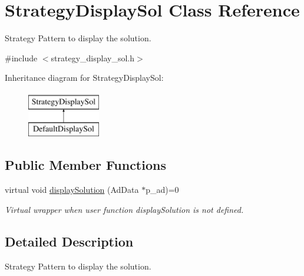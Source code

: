 \hypertarget{classStrategyDisplaySol}{\section{\-Strategy\-Display\-Sol \-Class \-Reference}
\label{classStrategyDisplaySol}
}


\-Strategy \-Pattern to display the solution.  




{\ttfamily \#include $<$strategy\-\_\-display\-\_\-sol.\-h$>$}

\-Inheritance diagram for \-Strategy\-Display\-Sol\-:\begin{figure}[H]
\begin{center}
\leavevmode
\includegraphics[height=2.000000cm]{classStrategyDisplaySol}
\end{center}
\end{figure}
\subsection*{\-Public \-Member \-Functions}
\begin{DoxyCompactItemize}
\item 
virtual void \hyperlink{classStrategyDisplaySol_aa4d70248e3281b868beb92875c8503c5}{display\-Solution} (\-Ad\-Data $\ast$p\-\_\-ad)=0
\begin{DoxyCompactList}\small\item\em \-Virtual wrapper when user function display\-Solution is not defined. \end{DoxyCompactList}\end{DoxyCompactItemize}


\subsection{\-Detailed \-Description}
\-Strategy \-Pattern to display the solution. 

